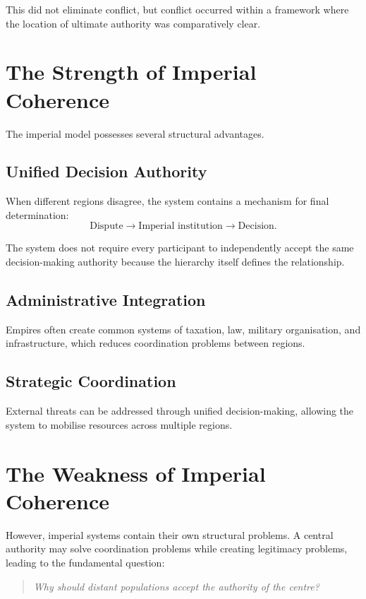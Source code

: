 \documentclass[11pt,openany]{book}
\theoremstyle{plain}
\theoremstyle{definition}
\begin{document}
This did not eliminate conflict, but conflict occurred within a framework where the location of ultimate authority was comparatively clear.

\section*{The Strength of Imperial Coherence}

The imperial model possesses several structural advantages.

\subsection*{Unified Decision Authority}

When different regions disagree, the system contains a mechanism for final determination:
\[
\text{Dispute}
\longrightarrow
\text{Imperial institution}
\longrightarrow
\text{Decision}.
\]

The system does not require every participant to independently accept the same decision-making authority because the hierarchy itself defines the relationship.

\subsection*{Administrative Integration}

Empires often create common systems of taxation, law, military organisation, and infrastructure, which reduces coordination problems between regions.

\subsection*{Strategic Coordination}

External threats can be addressed through unified decision-making, allowing the system to mobilise resources across multiple regions.

\section*{The Weakness of Imperial Coherence}

However, imperial systems contain their own structural problems. A central authority may solve coordination problems while creating legitimacy problems, leading to the fundamental question:
\begin{quote}
\textit{Why should distant populations accept the authority of the centre?}
\end{quote}
\end{document}
